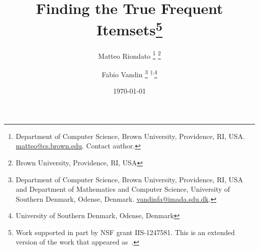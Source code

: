 \documentclass[twoside]{article}
\begin{document}
\title{Finding the True Frequent Itemsets\thanks{Work supported in part by NSF
grant IIS-1247581.
\ifarxiv
 This is an extended version of the work that appeared
as~\citep{RiondatoV14}.
\fi
}
}
\author{Matteo Riondato
\ifarxiv
\thanks{Department of Computer Science, Brown University, Providence, RI, USA.
\url{matteo@cs.brown.edu}. Contact author.}
\else
\thanks{Brown University, Providence, RI, USA}
\fi
\and Fabio Vandin
\ifarxiv
\thanks{Department of Computer Science, Brown University, Providence, RI, USA
and Department of Mathematics and Computer Science, University of Southern
Denmark, Odense, Denmark. \url{vandinfa@imada.sdu.dk}.}
\else
\textsuperscript{$\dagger$,}\thanks{University of Southern Denmark, Odense, Denmark}
\fi
}

\date{\today}

\maketitle







%




%
%

\ifarxiv
%



\else
\balance

\fi
\end{document}
